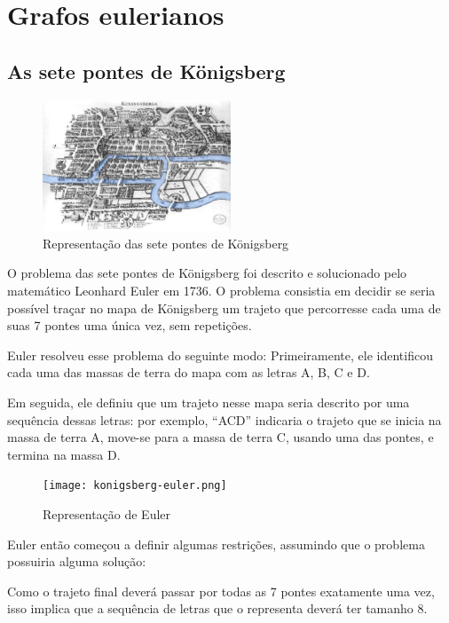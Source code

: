 \section{Grafos eulerianos}

\subsection{As sete pontes de Königsberg}

\begin{figure} 
    \centering
    \includegraphics[width=0.5\textwidth]{konigsberg.png}
    \caption{Representação das sete pontes de Königsberg}
\end{figure}

O pro\-blema das sete pontes de Kö\-nigsberg foi des\-crito e solucio\-nado pelo matemático Leonhard Eu\-ler em 1736. 
O problema consistia em decidir se seria possível traçar no mapa de Königsberg um trajeto que percorresse cada uma de suas 7 pon\-tes uma única vez, sem repetições.

Euler resolveu esse problema do seguinte modo: 
Primeiramente, ele identificou cada uma das massas de terra do mapa com as letras A, B, C e D.

Em seguida, ele definiu que um trajeto nesse mapa seria descrito por uma sequência dessas letras: por exemplo, ``ACD'' indicaria o trajeto que se inicia na massa de terra A, move-se para a massa de terra C, usando uma das pontes, e termina na massa D.

\begin{figure} 
    \centering
    \texttt{[image: konigsberg-euler.png]}
    \caption{Representação de Euler}
	\label{konigsberg-euler}
\end{figure}

Euler então começou a definir algumas restrições, assumindo que o problema possuiria alguma solução:

Como o trajeto final deverá passar por todas as 7 pontes exatamente uma vez, isso implica que a sequência de letras que o representa deverá ter tamanho 8.


